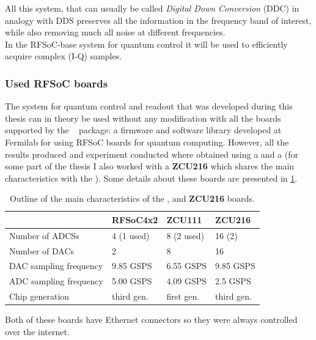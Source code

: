 All this system, that can usually be called \textit{Digital Down Conversion} (DDC) in analogy with DDS preserves all the information in the frequency band of interest, while also removing much all noise at different frequencies.\\
In the RFSoC-base system for quantum control it will be used to efficiently acquire complex (I-Q) samples.

\subsubsection{Used RFSoC boards}

The system for quantum control and readout that was developed during this thesis can in theory be used without any modification with all the boards supported by the \Qick~\cite{Stefanazzi2022} package: a firmware and software library developed at Fermilab for using RFSoC boards for quantum computing.
However, all the results produced and experiment conducted where obtained using a \RFSoC and a \ZCU (for some part of the thesis I also worked with a \textbf{ZCU216} which shares the main characteristics with the \ZCU).
Some details about these boards are presented in \cref{tab:used_rfsocs}.

\begin{table}[ht]
    \centering
    \begin{tabular}{llll}
                            & RFSoC4x2            & ZCU111               & ZCU216 \\ \hline
    Number of ADCSs         & 4 (1 used)          & 8 (2 used)           & 16 (2)      \\
    Number of DACs          & 2                   & 8                    & 16          \\
    DAC sampling frequency  & 9.85 GSPS           & 6.55 GSPS            & 9.85 GSPS   \\
    ADC sampling frequency  & 5.00 GSPS           & 4.09 GSPS            & 2.5 GSPS    \\
    Chip generation         & third gen.          & first gen.           & third gen.  \\
    \end{tabular}
    \caption[Characteristics of the supported RFSoCs]{Outline of the main characteristics of the \RFSoC, \ZCU and \textbf{ZCU216} boards.}
    \label{tab:used_rfsocs}
\end{table}
Both of these boards have Ethernet connectors so they were always controlled over the internet.

